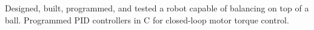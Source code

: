 \documentclass[paper=a4,fontsize=11pt]{article} %
\def \sectionSpace      {0.7cm}     %
\def \leftColSpace      {0.12}      %
\def \bigMiddleColSpace {0.875}     %
\begin{document}
    \noindent
    \begin{minipage}[t]{\leftColSpace\linewidth}
        \hfill
    \end{minipage}
    \begin{minipage}[t]{\bigMiddleColSpace\linewidth}
        Designed, built, programmed, and tested a robot capable of balancing on top of a ball. Programmed PID controllers in C for closed-loop motor torque control. \\
    \end{minipage}
    \vspace{\sectionSpace}
\end{document}
